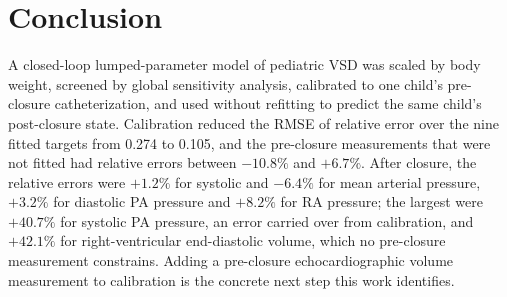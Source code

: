 \documentclass{article}
\begin{document}
\FloatBarrier
\section{Conclusion}
\label{sec:conclusion}
A closed-loop lumped-parameter model of pediatric VSD was scaled by body weight, screened by global sensitivity analysis, calibrated to one child's pre-closure catheterization, and used without refitting to predict the same child's post-closure state. Calibration reduced the RMSE of relative error over the nine fitted targets from 0.274 to 0.105, and the pre-closure measurements that were not fitted had relative errors between $-10.8\%$ and $+6.7\%$. After closure, the relative errors were $+1.2\%$ for systolic and $-6.4\%$ for mean arterial pressure, $+3.2\%$ for diastolic PA pressure and $+8.2\%$ for RA pressure; the largest were $+40.7\%$ for systolic PA pressure, an error carried over from calibration, and $+42.1\%$ for right-ventricular end-diastolic volume, which no pre-closure measurement constrains.  Adding a pre-closure echocardiographic volume measurement to calibration is the concrete next step this work identifies.

\FloatBarrier
\appendix
\end{document}
